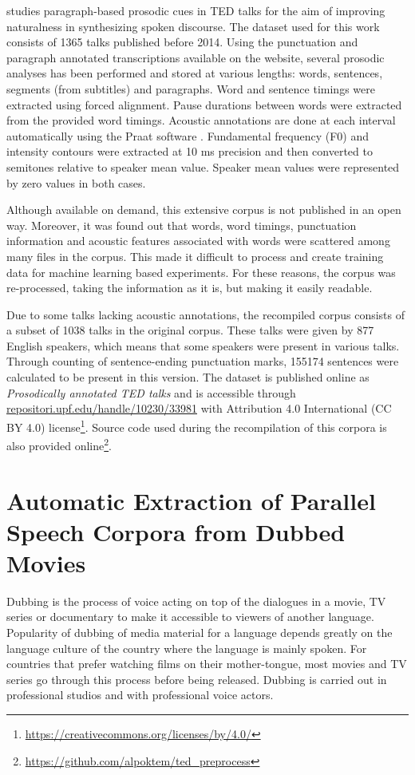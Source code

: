 \cite{Farrus:SP:2016} studies paragraph-based prosodic cues in TED talks for the aim of improving naturalness in synthesizing spoken discourse. The dataset used for this work consists of 1365 talks published before 2014. Using the punctuation and paragraph annotated transcriptions available on the website, several prosodic analyses has been performed and stored at various lengths: words, sentences, segments (from subtitles) and paragraphs. Word and sentence timings were extracted using forced alignment. Pause durations between words were extracted from the provided word timings. Acoustic annotations are done at each interval automatically using the Praat software \citep{praat:2016}. Fundamental frequency (F0) and intensity contours were extracted at 10 ms precision and then converted to semitones relative to speaker mean value. Speaker mean values were represented by zero values in both cases. 

Although available on demand, this extensive corpus is not published in an open way. Moreover, it was found out that words, word timings, punctuation information and acoustic features associated with words were scattered among many files in the corpus. This made it difficult to process and create training data for machine learning based experiments. For these reasons, the corpus was re-processed, taking the information as it is, but making it easily readable. 

Due to some talks lacking acoustic annotations, the recompiled corpus consists of a subset of 1038 talks in the original corpus. These talks were given by 877 English speakers, which means that some speakers were present in various talks. Through counting of sentence-ending punctuation marks, 155174 sentences were calculated to be present in this version. The dataset is published online as \textit{Prosodically annotated TED talks} and is accessible through \url{repositori.upf.edu/handle/10230/33981} with Attribution 4.0 International (CC BY 4.0) license\footnote{\url{https://creativecommons.org/licenses/by/4.0/}}. Source code used during the recompilation of this corpora is also provided online\footnote{\url{https://github.com/alpoktem/ted_preprocess}}.


\section{Automatic Extraction of Parallel Speech Corpora from Dubbed Movies}
\label{corpusWorks:movie2parallelDB}
Dubbing is the process of voice acting on top of the dialogues in a movie, TV series or documentary to make it accessible to viewers of another language. Popularity of dubbing of media material for a language depends greatly on the language culture of the country where the language is mainly spoken. For countries that prefer watching films on their mother-tongue, most movies and TV series go through this process before being released. Dubbing is carried out in professional studios and with professional voice actors. 

